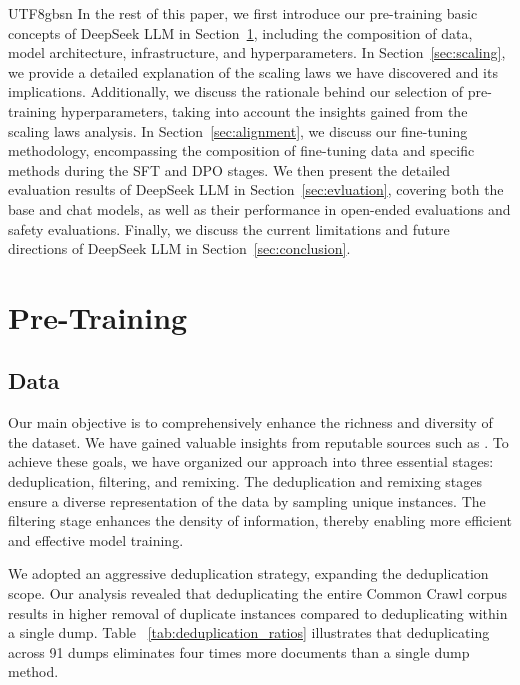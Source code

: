 \documentclass[11pt, a4paper, logo, copyright, nonumbering]{deepseek}
\begin{document}
\begin{CJK*}{UTF8}{gbsn}
In the rest of this paper, we first introduce our pre-training basic concepts of DeepSeek LLM in Section~\ref{sec:pre-training}, including the composition of data, model architecture, infrastructure, and hyperparameters. In Section~\ref{sec:scaling}, we provide a detailed explanation of the scaling laws we have discovered and its implications. Additionally, we discuss the rationale behind our selection of pre-training hyperparameters, taking into account the insights gained from the scaling laws analysis. 
In Section~\ref{sec:alignment}, we discuss our fine-tuning methodology, encompassing the composition of fine-tuning data and specific methods during the SFT and DPO stages.
We then present the detailed evaluation results of DeepSeek LLM in Section~\ref{sec:evluation}, covering both the base and chat models, as well as their performance in open-ended evaluations and safety evaluations. Finally, we discuss the current limitations and future directions of DeepSeek LLM in Section~\ref{sec:conclusion}.

\section{Pre-Training}

\label{sec:pre-training}

\subsection{Data}

Our main objective is to comprehensively enhance the richness and diversity of the dataset. We have gained valuable insights from reputable sources such as \citep{pile, llama, redpajama, refinedweb}. To achieve these goals, we have organized our approach into three essential stages: deduplication, filtering, and remixing. The deduplication and remixing stages ensure a diverse representation of the data by sampling unique instances. The filtering stage enhances the density of information, thereby enabling more efficient and effective model training.

We adopted an aggressive deduplication strategy, expanding the deduplication scope. Our analysis revealed that deduplicating the entire Common Crawl corpus results in higher removal of duplicate instances compared to deduplicating within a single dump. Table ~\ref{tab:deduplication_ratios} illustrates that deduplicating across 91 dumps eliminates four times more documents than a single dump method.


\end{CJK*}
\end{document}
